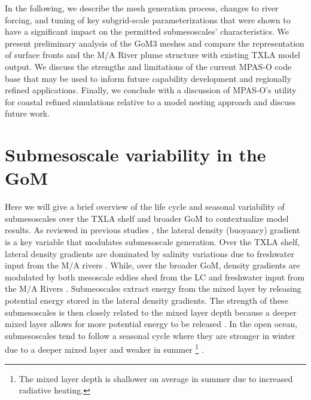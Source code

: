 In the following, we describe the mesh generation process, changes to river forcing, and tuning of key subgrid-scale parameterizations that were shown to have a significant impact on the permitted submesoscales' characteristics. We present preliminary analysis of the GoM3 meshes and compare the representation of surface fronts and the M/A River plume structure with existing TXLA model output. We discuss the strengths and limitations of the current MPAS-O code base that may be used to inform future capability development and regionally refined applications. Finally, we conclude with a discussion of MPAS-O's utility for coastal refined simulations relative to a model nesting approach and discuss future work.

\section{Submesoscale variability in the GoM}
Here we will give a brief overview of the life cycle and seasonal variability of submesoscales over the TXLA shelf and broader GoM to contextualize model results. As reviewed in previous studies \citep{McWilliams_2016, taylor2023submesoscale}, the lateral density (buoyancy) gradient is a key variable that modulates submesoscale generation. Over the TXLA shelf, lateral density gradients are dominated by salinity variations due to freshwater input from the M/A rivers \citep{Hetland_2017}. While, over the broader GoM, density gradients are modulated by both mesoscale eddies shed from the LC and freshwater input from the M/A Rivers \citep{bracco2019mesoscale, liu2021submesoscale}. Submeoscales extract energy from the mixed layer by releasing potential energy stored in the lateral density gradients. The strength of these submesoscales is then closely related to the mixed layer depth because a deeper mixed layer allows for more potential energy to be released \citep{boccaletti2007mixed, fox2008parameterization}. In the open ocean, submesoscales tend to follow a seasonal cycle where they are stronger in winter due to a deeper mixed layer and weaker in summer \footnote{The mixed layer depth is shallower on average in summer due to increased radiative heating.} \citep{callies2015seasonality}. 

